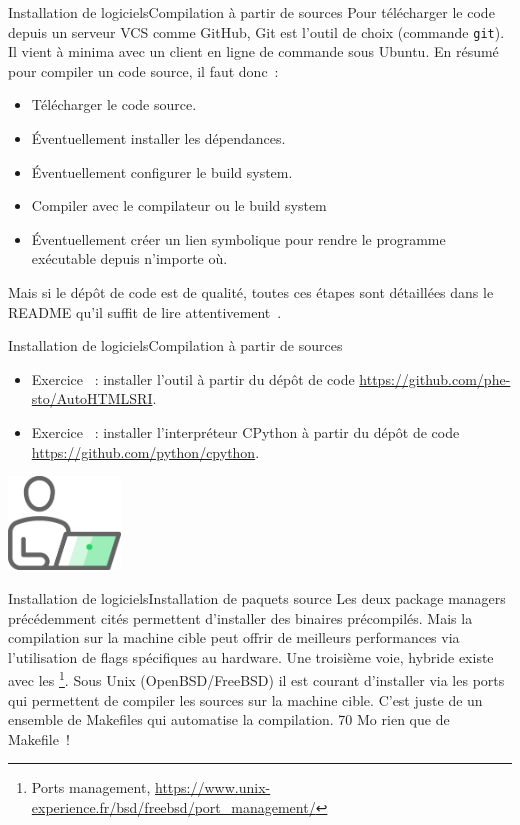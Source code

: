 \documentclass{beamer}
\begin{document}
    \begin{frame}{Installation de logiciels}{Compilation à partir de sources}
        Pour télécharger le code depuis un serveur VCS comme GitHub, Git est l'outil de choix (commande \lstinline{git}).
        Il vient à minima avec un client en ligne de commande sous Ubuntu.
        \bigbreak
        En résumé pour compiler un code source, il faut donc~:
        \begin{itemize}
            \item Télécharger le code source.
            \item Éventuellement installer les dépendances.
            \item Éventuellement configurer le build system.
            \item Compiler avec le compilateur ou le build system
            \item Éventuellement créer un lien symbolique pour rendre le programme exécutable depuis n'importe où.
        \end{itemize}
        Mais si le dépôt de code est de qualité, toutes ces étapes sont détaillées dans le README qu'il suffit de lire attentivement~.
    \end{frame}

    \begin{frame}{Installation de logiciels}{Compilation à partir de sources}
        \begin{itemize}
            \item Exercice \execcounterdispinc{}~: installer l'outil à partir du dépôt de code \url{https://github.com/phe-sto/AutoHTMLSRI}.
            \item Exercice \execcounterdispinc{}~: installer l'interpréteur CPython à partir du dépôt de code \url{https://github.com/python/cpython}.
        \end{itemize}
        \bigbreak
        \centering
        \includegraphics[width=3cm]{image/guy-in-front-of-desktop}
    \end{frame}

    \begin{frame}{Installation de logiciels}{Installation de paquets source}
        Les deux package managers précédemment cités permettent d'installer des binaires précompilés.
        Mais la compilation sur la machine cible peut offrir de meilleurs performances via l'utilisation de flags spécifiques au hardware.
        \bigbreak
        Une troisième voie, hybride existe avec les \footnote{Ports management, \url{https://www.unix-experience.fr/bsd/freebsd/port_management/}}.
        Sous Unix (OpenBSD/FreeBSD) il est courant d'installer via les ports qui permettent de compiler les sources sur la machine cible.
        C'est juste de un ensemble de Makefiles qui automatise la compilation.
        70 Mo rien que de Makefile~!
    \end{frame}
\end{document}
